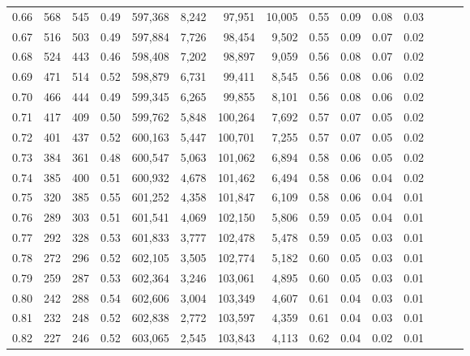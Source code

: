 \begin{tabular}{rrrrrrrrrrrrrrr}
0.66 &     568 &    545 &  0.49 &  597,368 &    8,242 &   97,951 &   10,005 &  0.55 &  0.09 &  0.08 &      0.03 \\
0.67 &     516 &    503 &  0.49 &  597,884 &    7,726 &   98,454 &    9,502 &  0.55 &  0.09 &  0.07 &      0.02 \\
0.68 &     524 &    443 &  0.46 &  598,408 &    7,202 &   98,897 &    9,059 &  0.56 &  0.08 &  0.07 &      0.02 \\
0.69 &     471 &    514 &  0.52 &  598,879 &    6,731 &   99,411 &    8,545 &  0.56 &  0.08 &  0.06 &      0.02 \\
0.70 &     466 &    444 &  0.49 &  599,345 &    6,265 &   99,855 &    8,101 &  0.56 &  0.08 &  0.06 &      0.02 \\
0.71 &     417 &    409 &  0.50 &  599,762 &    5,848 &  100,264 &    7,692 &  0.57 &  0.07 &  0.05 &      0.02 \\
0.72 &     401 &    437 &  0.52 &  600,163 &    5,447 &  100,701 &    7,255 &  0.57 &  0.07 &  0.05 &      0.02 \\
0.73 &     384 &    361 &  0.48 &  600,547 &    5,063 &  101,062 &    6,894 &  0.58 &  0.06 &  0.05 &      0.02 \\
0.74 &     385 &    400 &  0.51 &  600,932 &    4,678 &  101,462 &    6,494 &  0.58 &  0.06 &  0.04 &      0.02 \\
0.75 &     320 &    385 &  0.55 &  601,252 &    4,358 &  101,847 &    6,109 &  0.58 &  0.06 &  0.04 &      0.01 \\
0.76 &     289 &    303 &  0.51 &  601,541 &    4,069 &  102,150 &    5,806 &  0.59 &  0.05 &  0.04 &      0.01 \\
0.77 &     292 &    328 &  0.53 &  601,833 &    3,777 &  102,478 &    5,478 &  0.59 &  0.05 &  0.03 &      0.01 \\
0.78 &     272 &    296 &  0.52 &  602,105 &    3,505 &  102,774 &    5,182 &  0.60 &  0.05 &  0.03 &      0.01 \\
0.79 &     259 &    287 &  0.53 &  602,364 &    3,246 &  103,061 &    4,895 &  0.60 &  0.05 &  0.03 &      0.01 \\
0.80 &     242 &    288 &  0.54 &  602,606 &    3,004 &  103,349 &    4,607 &  0.61 &  0.04 &  0.03 &      0.01 \\
0.81 &     232 &    248 &  0.52 &  602,838 &    2,772 &  103,597 &    4,359 &  0.61 &  0.04 &  0.03 &      0.01 \\
0.82 &     227 &    246 &  0.52 &  603,065 &    2,545 &  103,843 &    4,113 &  0.62 &  0.04 &  0.02 &      0.01 \\

\end{tabular}
